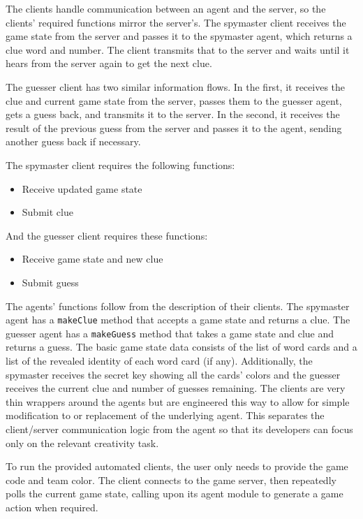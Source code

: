 \documentclass[phd,electronic,oneside,twosidetoc,letterpaper,chaptercenter,parttop,lof]{byumsphd}
\begin{document}
The clients handle communication between an agent and the server, so the clients' required functions mirror the server's. The spymaster client receives the game state from the server and passes it to the spymaster agent, which returns a clue word and number. The client transmits that to the server and waits until it hears from the server again to get the next clue. 

The guesser client has two similar information flows. In the first, it receives the clue and current game state from the server, passes them to the guesser agent, gets a guess back, and transmits it to the server. In the second, it receives the result of the previous guess from the server and passes it to the agent, sending another guess back if necessary. 


The spymaster client requires the following functions:

\begin{itemize}
    \setlength{\itemindent}{2em}
    \item Receive updated game state
    \item Submit clue
\end{itemize}

And the guesser client requires these functions:

\begin{itemize}
    \setlength{\itemindent}{2em}
    \item Receive game state and new clue
    \item Submit guess
\end{itemize}

The agents' functions follow from the description of their clients. 
The spymaster agent has a \texttt{makeClue} method that accepts a game state and returns a clue. 
The guesser agent has a \texttt{makeGuess} method that takes a game state and clue and returns a guess.  The basic game state data consists of the list of word cards and a list of the revealed identity of each word card (if any). Additionally, the spymaster receives the secret key showing all the cards' colors and the guesser receives the current clue and number of guesses remaining. The clients are very thin wrappers around the agents but are engineered this way to allow for simple modification to or replacement of the underlying agent. This separates the client/server communication logic from the agent so that its developers can focus only on the relevant creativity task.

To run the provided automated clients, the user only needs to provide the game code and team color. The client connects to the game server, then repeatedly polls the current game state, calling upon its agent module to generate a game action when required.
\end{document}
